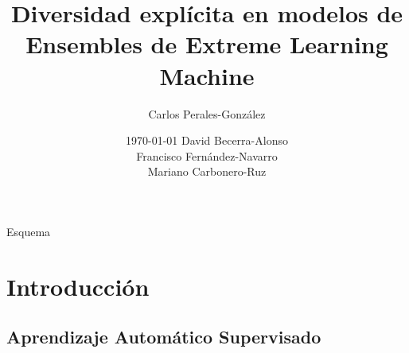 \documentclass{beamer}
\title[Diversidad en ensembles de ELM]{Diversidad explícita en modelos de Ensembles de Extreme Learning Machine}
\author[C. Perales-González]
{   %
    Carlos Perales-Gonz\'alez\inst{1}
}
\institute[ULOYOLA]
{   %
    \begin{tabular}{c}
    \inst{1}Universidad Loyola Andaluc\'ia
    \end{tabular}
}
\date
{   %
	\today
	David Becerra-Alonso \\
	Francisco Fernández-Navarro \\
	Mariano Carbonero-Ruz\\
}
\begin{document}
\frame{\titlepage}

\begin{frame}{Esquema}
\tableofcontents
\end{frame}


\section{Introducción} %

%	
%	
%	
%

\subsection{Aprendizaje Automático Supervisado}

%
%	
\end{document}
